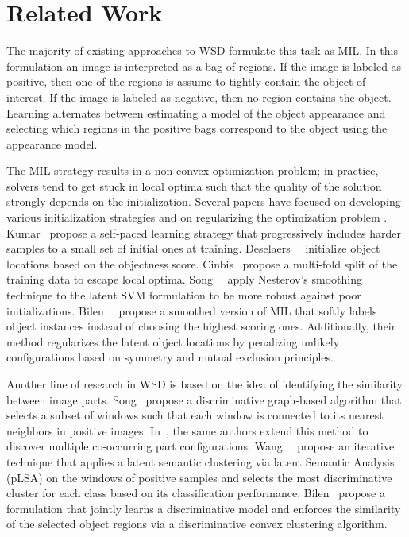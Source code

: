 \documentclass[10pt,twocolumn,letterpaper]{article}
\begin{document}
\section{Related Work}\label{s:related}
The majority of existing approaches to WSD formulate this task as  MIL. In this formulation an image is interpreted as a bag of regions. If the image is labeled as positive, then one of the regions is assume to tightly contain the object of interest. If the image is labeled as negative, then no region contains the object. Learning alternates between estimating a model of the object appearance and selecting which regions in the positive bags correspond to the object using the appearance model. 

The MIL strategy results in a non-convex optimization problem; in practice, solvers tend to get stuck in local optima such that the quality of the solution strongly depends on the initialization. Several papers have focused on developing various initialization strategies \cite{Kumar10a,Deselaers10,Song14a,Cinbis15} and on regularizing the optimization problem \cite{Song14,Bilen14}. Kumar~\etal \cite{Kumar10a} propose a self-paced learning strategy that progressively includes harder samples to a small set of initial ones at training. Deselaers~\etal~\cite{Deselaers10} initialize object locations based on the objectness score. Cinbis~\etal \cite{Cinbis15} propose a multi-fold split of the training data to escape local optima. Song~\etal~\cite{Song14} apply Nesterov's smoothing technique \cite{Nesterov05} to the latent SVM formulation \cite{Felzenszwalb10a} to be more robust against poor initializations. Bilen~\etal~\cite{Bilen14} propose a smoothed version of MIL that softly labels object instances instead of choosing the highest scoring ones. Additionally, their method regularizes the latent object locations by penalizing unlikely configurations based on symmetry and mutual exclusion principles.

Another line of research in WSD \cite{Song14,Song14a,Wang14a} is based on the idea of identifying the similarity between image parts. Song~\etal \cite{Song14} propose a discriminative graph-based algorithm that selects a subset of windows such that each window is connected to its nearest neighbors in positive images. In~\cite{Song14a}, the same authors extend this method to discover multiple co-occurring part configurations. Wang~\etal~\cite{Wang14a} propose an iterative technique that applies a latent semantic clustering via latent Semantic Analysis (pLSA) on the windows of positive samples and selects the most discriminative cluster for each class based on its classification performance. Bilen~\etal \cite{Bilen15} propose a formulation that jointly learns a discriminative model and enforces the similarity of the selected object regions via a discriminative convex clustering algorithm.
\end{document}
